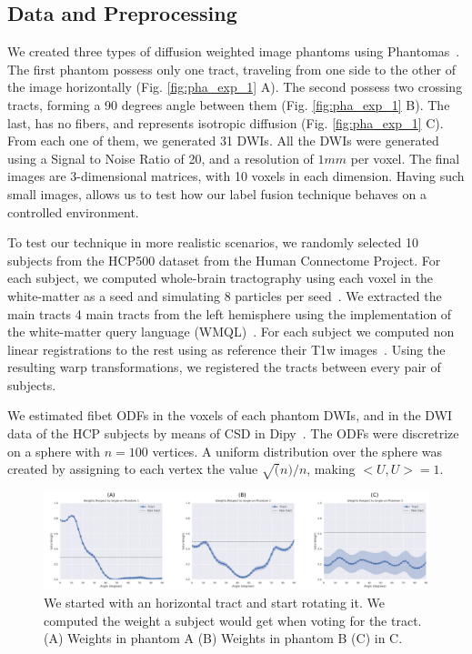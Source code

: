 \subsection{Data and Preprocessing}
We created three types of diffusion weighted image phantoms using Phantomas~\cite{Caruyer2014}.
The first phantom possess only one tract, traveling from one side to the other of the
image horizontally (Fig. \ref{fig:pha_exp_1} A). The second possess two crossing tracts,
forming a 90 degrees angle between them (Fig. \ref{fig:pha_exp_1} B). The last, has no
fibers, and represents isotropic diffusion (Fig. \ref{fig:pha_exp_1} C). From
each one of them, we generated 31 DWIs. All the DWIs were generated using a
Signal to Noise Ratio of 20, and a resolution of $1mm$ per voxel. The final
images are 3-dimensional matrices, with 10 voxels in each dimension. Having
such small images, allows us to test how our label fusion technique behaves
on a controlled environment.

To test our technique in more realistic scenarios, we randomly selected 10 subjects
from the HCP500 dataset from the Human Connectome Project. For each subject,
we computed whole-brain tractography using each voxel in the white-matter as
a seed and simulating 8 particles per seed~\cite{Garyfallidis2014}. We extracted
the main tracts 4 main tracts from the left hemisphere using
the implementation of the white-matter query language (WMQL)~\cite{Wassermann2016}.
For each subject we computed non linear registrations to the rest using as
reference their T1w images~\cite{Jenkinson2012}. Using the resulting warp
transformations, we registered the tracts between every pair of subjects.

We estimated fibet ODFs in the voxels of each phantom DWIs, and in the DWI data
of the HCP subjects by means of CSD in Dipy~\cite{Garyfallidis2014}. The ODFs were
discretrize on a sphere with $n=100$ vertices. A uniform distribution over the sphere
was created by assigning to each vertex the value $\sqrt(n)/n$, making $<U, U> = 1$.

\begin{figure}[t]
    \includegraphics[width=\textwidth]{7.multiatlas/img/weights.png}
    \caption{We started with an horizontal tract and start rotating it. We computed
             the weight a subject would get when voting for the tract. 
             (A) Weights in phantom A (B) Weights in phantom B (C) in C.}
    \label{fig:weights}
\end{figure} 

